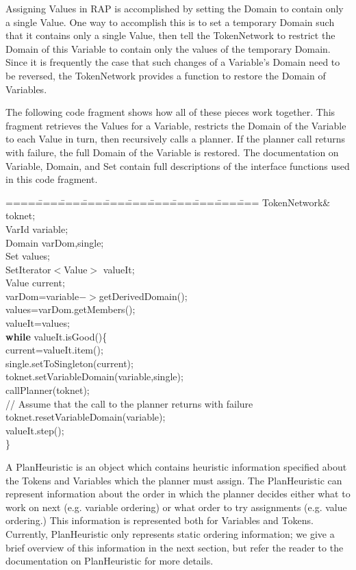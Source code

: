 Assigning Values in RAP is accomplished by setting the Domain to
contain only a single Value.  One way to accomplish this is to set a
temporary Domain such that it contains only a single Value, then tell
the TokenNetwork to restrict the Domain of this Variable 
to contain only the values of the temporary Domain.
Since it is frequently the case that such changes of a Variable's
Domain need to be reversed, the TokenNetwork provides a function to
restore the Domain of Variables.

The following code fragment shows how all of these pieces work
together.  This fragment retrieves the Values for a Variable,
restricts the Domain of the Variable to each Value in turn, then
recursively calls a planner.  If the planner call returns with
failure, the full Domain of the Variable is restored.  The
documentation on Variable, Domain, and Set contain full descriptions
of the interface functions used in this code fragment.

\begin{tabbing}
====\====\====\====\====\====\====\====\====\====\====\kill
TokenNetwork\& toknet;\\
VarId variable;\\
Domain varDom,single;\\
Set values;\\
SetIterator$<$Value$>$ valueIt;\\
Value current;\\
varDom=variable$->$getDerivedDomain();\\
values=varDom.getMembers();\\
valueIt=values;\\
{\bf while} valueIt.isGood()\{\\
\> current=valueIt.item();\\
\> single.setToSingleton(current);\\
\> toknet.setVariableDomain(variable,single);\\
\> callPlanner(toknet);\\
\> // Assume that the call to the planner returns with failure\\
\> toknet.resetVariableDomain(variable);\\
\> valueIt.step();\\
\}\\
\end{tabbing}

A PlanHeuristic is an object which contains heuristic information
specified about the Tokens and Variables which the planner must assign.  
The PlanHeuristic can represent information about
the order in which the planner decides either what to work on
next (e.g. variable ordering) or what order to try assignments
(e.g. value ordering.)  This information is represented both
for Variables and Tokens.  Currently, PlanHeuristic only represents
static ordering information; we give a brief overview of this
information in the next section, but refer the reader to the documentation
on PlanHeuristic for more details.

